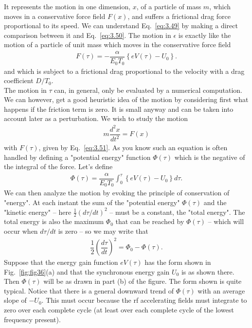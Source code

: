 It represents the motion in one dimension, $x$, of a particle of mass $m$, which
moves in a conservative force field $F(x)$, and suffers a frictional drag force proportional
 to its speed. We can understand Eq.~\eqref{eq:3.49} by making a direct comparison between it and Eq.~\eqref{eq:3.50}. The motion in $\epsilon$ is exactly like the motion of a particle of unit mass which moves in the conservative force field
\begin{align}\label{eq:3.51}
	F(\tau) = - \dfrac{\alpha}{E_0 T_0} \left\lbrace eV(\tau) - U_0 \right\rbrace.
\end{align}
and which is subject to a frictional drag proportional to the velocity with a drag coefficient
 $D/T_0$.\\
 The motion in $\tau$ can, in general, only be evaluated by a numerical computation. We can however, get a good heuristic idea of the motion by considering first what happens if the friction term is zero. It is small anyway and can be taken into account later as a perturbation.
 We wish to study the motion
\begin{align}
	m\dfrac{d^2x}{dt^2} = F(x)
\end{align}
with $F(\tau)$, given by Eq.~\eqref{eq:3.51}. As you know such an equation is often handled by
defining a "potential energy" function $\Phi(\tau)$ which is the negative of the integral
 of the force. Let's define
\begin{align} \label{eq:3.53}
	\Phi(\tau) = \dfrac{\alpha}{E_0 T_0} \int_0^\tau \left\lbrace eV(\tau) - U_0 \right\rbrace d\tau.
\end{align}
We can then analyze the motion by evoking the principle of conservation of "energy". At each instant the sum of the "potential energy" $\Phi(\tau)$ and the "kinetic energy" -- here $\frac{1}{2} (d\tau/dt)^2$ -- must be a constant, the "total energy". The total energy is
also the maximum $\Phi_0$ that can be reached by $\Phi(\tau)$ -- which will occur when $d\tau/dt$
is zero -- so we may write that
\begin{align}\label{eq:3.54}
	\dfrac{1}{2}\left(\dfrac{d\tau}{dt}\right)^2 = \Phi_0 - \Phi(\tau).
\end{align}
Suppose that the energy gain function $eV(\tau)$ has the form shown in Fig.~\ref{fig:fig36}(a) and that the synchronous energy gain $U_0$ is as shown there. Then $\Phi(\tau)$ will be as drawn in part (b) of the figure. The form shown is quite typical.  Notice that there is a general downward trend of $\Phi(\tau)$ with an average slope of $-U_0$. This must occur because the rf accelerating fields must integrate to zero over each complete cycle (at least over each complete cycle of the lowest frequency present).\\
